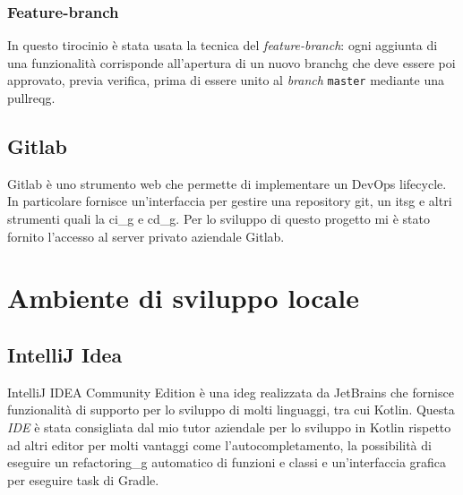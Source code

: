 \subsubsection*{Feature-branch}
In questo tirocinio è stata usata la tecnica del \emph{feature-branch}: ogni aggiunta di una funzionalità corrisponde all'apertura di un nuovo \gls{branchg} che deve essere poi approvato, previa verifica, prima di essere unito al \emph{branch} \verb|master| mediante una \gls{pullreqg}.

\subsection{Gitlab}
Gitlab è uno strumento web che permette di implementare un DevOps lifecycle. In particolare fornisce un'interfaccia per gestire una repository git, un \gls{itsg} e altri strumenti quali la \gls{ci_g} e \gls{cd_g}. Per lo sviluppo di questo progetto mi è stato fornito l'accesso al server privato aziendale Gitlab.

\section{Ambiente di sviluppo locale}
\subsection{IntelliJ Idea}
IntelliJ IDEA Community Edition è una \gls{ideg} realizzata da JetBrains che fornisce funzionalità di supporto per lo sviluppo di molti linguaggi, tra cui Kotlin. Questa \emph{IDE} è stata consigliata dal mio tutor aziendale per lo sviluppo in Kotlin rispetto ad altri editor per molti vantaggi come l'autocompletamento, la possibilità di eseguire un \gls{refactoring_g} automatico di funzioni e classi e un'interfaccia grafica per eseguire task di Gradle.
 

